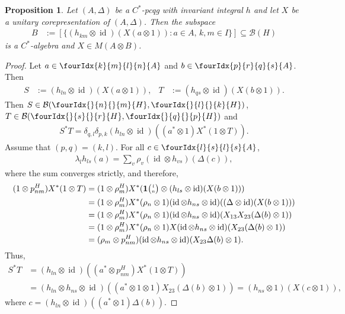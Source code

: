 \documentclass[11pt]{article}
\DeclareMathOperator{\id}{id}
\newcommand{\Grt}[3]{#1{\tiny {\begin{pmatrix} #2\\#3\end{pmatrix}}}}
\newcommand{\UnitC}[2]{\Grt{\mathbf{1}}{#1}{#2}}
\newcommand{\Gr}[5]{\fourIdx{#2}{#4}{#3}{#5}{#1}}%
\newcommand{\Grd}[3]{\Gr{#1}{}{}{#2}{#3}}
\newtheorem{Prop}[Theorem]{Proposition}
\theoremstyle{definition}
\numberwithin{equation}{section}
\begin{document}
 \begin{Prop}
   Let $(A,\Delta)$ be a $C^{*}$-pcqg with invariant integral $h$ and
   let $X$ be a unitary corepresentation of $(A,\Delta)$. Then the
   subspace
   \begin{align*}
     B &:= [ \{(h_{km} \otimes
     \id)(X(a\otimes 1)) : a \in A,\, k,m\in I\}] \subseteq \mathcal{B}(H)
   \end{align*}
   is a $C^{*}$-algebra and $X\in M(A\otimes B)$.
 \end{Prop}
  \begin{proof}
    Let $a\in \Gr{A}{k}{l}{m}{n}$ and $b\in \Gr{A}{p}{q}{r}{s}$. Then
 \begin{align*}
   S&:=(h_{ln} \otimes \id)(X(a\otimes 1)), &
   T&:=(h_{qs} \otimes \id)(X(b\otimes 1)).
 \end{align*}
Then  $S \in \mathcal{B}(\Grd{H}{n}{m},\Grd{H}{l}{k})$, $T\in
\mathcal{B}(\Grd{H}{s}{r},\Grd{H}{q}{p})$ and
\begin{align*}
  S^{*}T = \delta_{q,l}\delta_{p,k} (h_{ln} \otimes \id)((a^{*}\otimes
  1)X^{*}(1\otimes T)).
\end{align*}
Assume that $(p,q)=(k,l)$.  For all $c\in \Gr{A}{l}{l}{s}{s}$,
\begin{align*}
  \lambda_{l} h_{ls}(a) = \sum_{v} \rho_{v}(\id \otimes h_{vs})(\Delta(c)),
\end{align*}
where the sum converges strictly, and therefore,
\begin{align*}
(1 \otimes p^{H}_{nm})  X^{*}(1\otimes T) &= (1 \otimes \rho^{H}_{m}) X^{*}(\UnitC{l}{n} \otimes (h_{ls} \otimes
  \id)(X(b\otimes 1))) \\
  &=  (1\otimes \rho^{H}_{m})X^{*}(\rho_{n} \otimes 1)(\id \otimes h_{ns}\otimes
  \id)((\Delta\otimes \id)(X(b\otimes 1))) \\
  &=  (1\otimes \rho^{H}_{m})X^{*}(\rho_{n} \otimes 1)(\id \otimes h_{ns}\otimes
  \id)(X_{13}X_{23}(\Delta(b)\otimes 1)) \\
  &=  (1\otimes \rho^{H}_{m}) X^{*}(\rho_{n} \otimes 1)X(\id \otimes h_{ns}\otimes
  \id)(X_{23}(\Delta(b)\otimes 1)) \\
  &= (\rho_{m} \otimes p^{H}_{nm})(\id \otimes h_{ns} \otimes
  \id)(X_{23}\Delta(b)\otimes 1).
\end{align*}
Thus,
\begin{align*}
  S^{*}T &= (h_{ln} \otimes \id)((a^{*}\otimes
  p^{H}_{nm})X^{*}(1\otimes T))  \\ &= (h_{ln} \otimes h_{ns} \otimes
  \id)((a^{*} \otimes 1\otimes 1)X_{23}(\Delta(b) \otimes 1)) 
  =(h_{ns} \otimes 1)(X(c\otimes 1)), 
\end{align*}
where $c=(h_{ln}
  \otimes \id)((a^{*}\otimes 1)\Delta(b))$.
  \end{proof}
\end{document}
